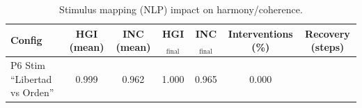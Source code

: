 \begin{table}[H]
\centering
\caption{Stimulus mapping (NLP) impact on harmony/coherence.}
\label{tab:p6_stimulus}
\begin{tabular}{lcccccc}
\toprule
Config & HGI (mean) & INC (mean) & HGI$_{\text{final}}$ & INC$_{\text{final}}$ & Interventions (\%) & Recovery (steps) \\
\midrule
 P6 Stim “Libertad vs Orden” & 0.999 & 0.962 & 1.000 & 0.965 & 0.000 &  \\
\bottomrule
\end{tabular}
\end{table}